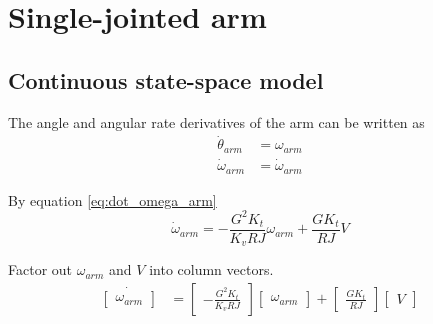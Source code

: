 \section{Single-jointed arm}
\label{sec:ss_model_single-jointed_arm}

\subsection{Continuous state-space model}

The angle and angular rate derivatives of the arm can be written as
\begin{align}
  \dot{\theta}_{arm} &= \omega_{arm} \\
  \dot{\omega}_{arm} &= \dot{\omega}_{arm}
\end{align}

By equation \eqref{eq:dot_omega_arm}
\begin{equation*}
  \dot{\omega}_{arm} = -\frac{G^2 K_t}{K_v RJ} \omega_{arm} + \frac{G K_t}{RJ} V
\end{equation*}

Factor out $\omega_{arm}$ and $V$ into column vectors.
\begin{align*}
  \dot{\begin{bmatrix}
    \omega_{arm}
  \end{bmatrix}} &=
  \begin{bmatrix}
    -\frac{G^2 K_t}{K_v RJ}
  \end{bmatrix}
  \begin{bmatrix}
    \omega_{arm}
  \end{bmatrix} +
  \begin{bmatrix}
    \frac{GK_t}{RJ}
  \end{bmatrix}
  \begin{bmatrix}
    V
  \end{bmatrix}
\end{align*}

